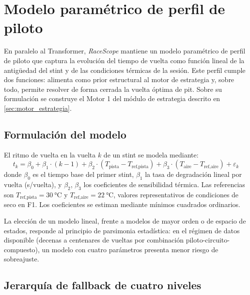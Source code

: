 \section{Modelo paramétrico de perfil de piloto}
\label{sec:modelo_parametrico}

En paralelo al Transformer, \textit{RaceScope} mantiene un modelo paramétrico de perfil de piloto que captura la evolución del tiempo de vuelta como función lineal de la antigüedad del stint y de las condiciones térmicas de la sesión. Este perfil cumple dos funciones: alimenta como prior estructural al motor de estrategia y, sobre todo, permite resolver de forma cerrada la vuelta óptima de pit. Sobre su formulación se construye el Motor 1 del módulo de estrategia descrito en \ref{sec:motor_estrategia}.

\subsection{Formulación del modelo}
\label{ssec:formulacion_parametrico}

El ritmo de vuelta en la vuelta $k$ de un stint se modela mediante:
\begin{equation}
    t_k = \beta_0 + \beta_1 \cdot (k - 1)
    + \beta_2 \cdot (T_{\text{pista}} - T_{\text{ref,pista}})
    + \beta_3 \cdot (T_{\text{aire}} - T_{\text{ref,aire}})
    + \varepsilon_k
    \label{eq:modelo_parametrico}
\end{equation}
donde $\beta_0$ es el tiempo base del primer stint, $\beta_1$ la tasa de degradación lineal por vuelta (s/vuelta), y $\beta_2$, $\beta_3$ los coeficientes de sensibilidad térmica. Las referencias son $T_{\text{ref,pista}} = 30~\si{\celsius}$ y $T_{\text{ref,aire}} = 22~\si{\celsius}$, valores representativos de condiciones de seco en F1. Los coeficientes se estiman mediante mínimos cuadrados ordinarios.

La elección de un modelo lineal, frente a modelos de mayor orden o de espacio de estados, responde al principio de parsimonia estadística: en el régimen de datos disponible (decenas a centenares de vueltas por combinación piloto-circuito-compuesto), un modelo con cuatro parámetros presenta menor riesgo de sobreajuste.
\subsection{Jerarquía de fallback de cuatro niveles}
\label{ssec:fallback_parametrico}

